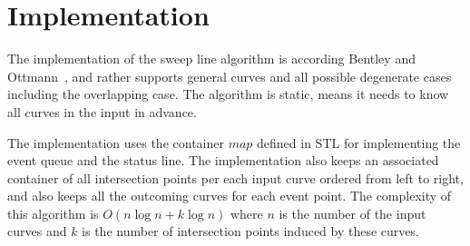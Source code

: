 \section{Implementation}

The implementation of the sweep line algorithm is according 
Bentley and Ottmann~\cite{bkos-cgaa-97}, and rather supports general curves and all 
possible degenerate cases including the overlapping case. 
The algorithm is static, means it needs to know all curves in the input 
in advance. 

The implementation uses the container $map$ defined in STL for
implementing the event queue and the status line. The implementation
also keeps an associated container of all 
intersection points per each input curve ordered from left to right, 
and also keeps all the outcoming curves for each event point. 
The complexity of this algorithm is $O(n\log{n} + k\log{n})$ where $n$ is the 
number of the input curves and $k$ is the number of intersection points induced by these
curves.
